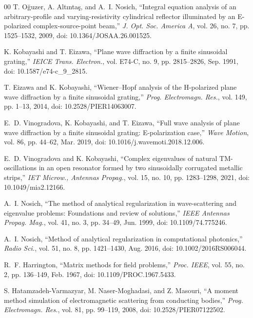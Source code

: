 \documentclass[conference]{IEEEtran}
\begin{document}
\begin{thebibliography}{00}
T. O\u{g}uzer, A. Alt\i nta\c{s}, and A.~I. Nosich, ``Integral equation analysis 
of an arbitrary-profile and varying-resistivity cylindrical reflector illuminated 
by an E-polarized complex-source-point beam,'' \emph{J. Opt. Soc. America A}, 
vol. 26, no. 7, pp. 1525--1532, 2009, doi: 10.1364/JOSAA.26.001525.

K. Kobayashi and T. Eizawa, ``Plane wave diffraction by a finite sinusoidal
grating,'' \emph{IEICE Trans. Electron.}, vol. E74-C, no. 9, pp. 2815--2826,
Sep. 1991, doi: 10.1587/e74-c\_9\_2815.

T. Eizawa and K. Kobayashi, ``Wiener--Hopf analysis of the H-polarized plane
wave diffraction by a finite sinusoidal grating,'' \emph{Prog.
Electromagn. Res.}, vol. 149, pp. 1--13, 2014,
doi: 10.2528/PIER14063007.

{}
E.~D. Vinogradova, K. Kobayashi, and T. Eizawa, ``Full wave analysis of plane
wave diffraction by a finite sinusoidal grating: E-polarization case,''
\emph{Wave Motion}, vol. 86, pp. 44--62, Mar. 2019,
doi: 10.1016/j.wavemoti.2018.12.006.

E.~D. Vinogradova and K. Kobayashi, ``Complex eigenvalues of natural
TM-oscillations in an open resonator formed by two sinusoidally corrugated
metallic strips,'' \emph{IET Microw., Antennas Propag.}, vol. 15, no. 10,
pp. 1283--1298, 2021, doi: 10.1049/mia2.12166.

A.~I. Nosich, ``The method of analytical regularization in wave-scattering and
eigenvalue problems: Foundations and review of solutions,'' \emph{IEEE
Antennas Propag. Mag.}, vol. 41, no. 3, pp. 34--49, Jun. 1999,
doi: 10.1109/74.775246.

A.~I. Nosich, ``Method of analytical regularization in computational
photonics,'' \emph{Radio Sci.}, vol. 51, no. 8, pp. 1421--1430, Aug. 2016,
doi: 10.1002/2016RS006044.

R.~F. Harrington, ``Matrix methods for field problems,'' \emph{Proc. IEEE},
vol. 55, no. 2, pp. 136--149, Feb. 1967,
doi: 10.1109/PROC.1967.5433.

S. Hatamzadeh-Varmazyar, M. Naser-Moghadasi, and Z. Masouri, ``A moment
method simulation of electromagnetic scattering from conducting bodies,''
\emph{Prog. Electromagn. Res.}, vol. 81, pp. 99--119, 2008,
doi: 10.2528/PIER07122502.

\end{thebibliography}
\end{document}
